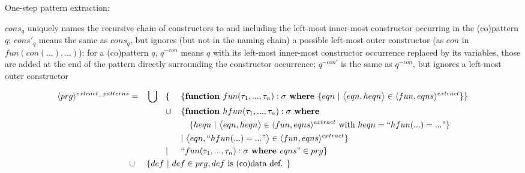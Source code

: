 \documentclass[11pt]{article} %
\begin{document}
One-step pattern extraction:

$cons_q$ uniquely names the recursive chain of constructors to and including the left-most inner-most constructor occurring in the (co)pattern $q$; $cons'_q$ means the same as $cons_q$, but ignores (but not in the naming chain) a possible left-most outer constructor (as $con$ in $fun(con(...), ...)$); for a (co)pattern $q$, $q^{-con}$ means $q$ with its left-most inner-most constructor occurrence replaced by its variables, those are added at the end of the pattern directly surrounding the constructor occurrence; $q^{-con'}$ is the same as $q^{-con}$, but ignores a left-most outer constructor

\begin{alignat*}{4}
\langle prg \rangle^{extract\_patterns} & = &&\bigcup &&\{ ~&&\{ \textrm{\textbf{function }} fun(\tau_1, ..., \tau_n): \sigma \textrm{\textbf{ where }} \{ eqn ~ | ~ \big\langle eqn, heqn \big\rangle \in \langle fun, eqns \rangle^{extract} \} \} \\
& && && \cup && \{ \textrm{\textbf{function }} hfun(\tau_1, ..., \tau_n): \sigma \textrm{\textbf{ where }} \\
& && && &&\quad \{ heqn ~ | ~ \big\langle eqn, heqn \big\rangle \in \langle fun, eqns \rangle^{extract} \textrm{ with } heqn = `` hfun(...) = ... " \} \\
& && && && | ~ \big\langle eqn, `` hfun(...) = ... " \big\rangle \in \langle fun, eqns \rangle^{extract} \} \\
& && && | && `` fun (\tau_1, ..., \tau_n): \sigma \textrm{\textbf{ where }} eqns " \in prg \} \\
& \cup && \{ def ~ | ~ def \in prg, def \textrm{ is (co)data def. } \} \span\span\span\span
\end{alignat*}
\end{document}
